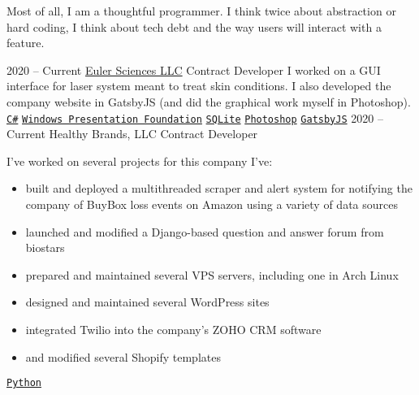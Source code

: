 \documentclass[9pt]{developercv} %
\begin{document}
    Most of all, I am a thoughtful programmer. I think twice about abstraction
    or hard coding, I think about tech debt and the way users will interact
    with a feature.



\begin{entrylist}
    \entry
        {2020 -- Current}
        {\href{https://euler-sci.com}{Euler Sciences LLC}}
        {Contract Developer}
        {
            I worked on a GUI interface for laser system meant to treat skin
            conditions. I also developed the company website in GatsbyJS (and
            did the graphical work myself in Photoshop).
        \\
        \texttt{{\href{https://en.wikipedia.org/wiki/C_Sharp_(programming_language)}{C\#}}}\slashsep
        \texttt{{\href{https://en.wikipedia.org/wiki/Windows_Presentation_Foundation}{Windows Presentation Foundation}}}\slashsep
        \texttt{{\href{https://www.sqlite.org/index.html}{SQLite}}}\slashsep
        \texttt{{\href{https://www.adobe.com/products/photoshop.html}{Photoshop}}}\slashsep
        \texttt{{\href{https://www.gatsbyjs.org/}{GatsbyJS}}}
        }
    \entry
        {2020 -- Current}
        {Healthy Brands, LLC}
        {Contract Developer}
        {
            I've worked on several projects for this company I've:
            \begin{itemize}[leftmargin=*, noitemsep]
                \item built and deployed a multithreaded scraper and alert system for notifying the company of BuyBox loss events on Amazon using a variety of data sources
                \item launched and modified a Django-based question and answer forum from biostars
                \item prepared and maintained several VPS servers, including one in Arch Linux
                \item designed and maintained several WordPress sites
                \item integrated Twilio into the company's ZOHO CRM software
                \item and modified several Shopify templates
            \end{itemize}
        \texttt{{\href{https://www.python.org/}{Python}}}\slashsep
}
\end{entrylist}
\end{document}

